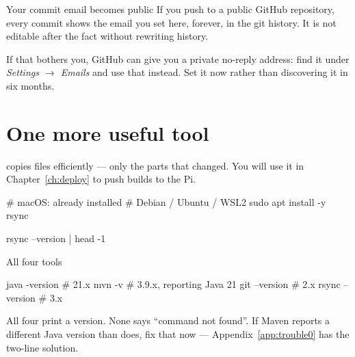 \begin{trap}{Your commit email becomes public}
If you push to a public GitHub repository, every commit shows the email you set
here, forever, in the git history. It is not editable after the fact without
rewriting history.

If that bothers you, GitHub can give you a private no-reply address: find it
under \emph{Settings $\rightarrow$ Emails} and use that instead. Set it now
rather than discovering it in six months.
\end{trap}

\section{One more useful tool}

 copies files efficiently --- only the parts that changed. You will
use it in Chapter~\ref{ch:deploy} to push builds to the Pi.

\begin{shell}
# macOS: already installed
# Debian / Ubuntu / WSL2
sudo apt install -y rsync

rsync --version | head -1
\end{shell}

\begin{checkpoint}{All four tools}
\begin{shell}
java -version     # 21.x
mvn -v            # 3.9.x, reporting Java 21
git --version     # 2.x
rsync --version   # 3.x
\end{shell}

All four print a version. None says ``command not found''. If Maven reports a
different Java version than  does, fix that now ---
Appendix~\ref{app:trouble0} has the two-line solution.
\end{checkpoint}
